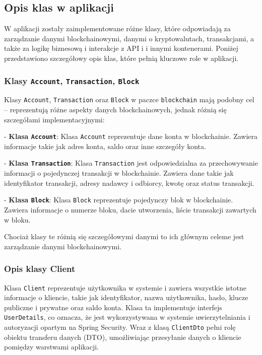 \subsection{Opis klas w aplikacji}

W aplikacji zostały zaimplementowane różne klasy, które odpowiadają za zarządzanie danymi blockchainowymi, danymi o kryptowalutach, transakcjami, a także za logikę biznesową i interakcje z API i i innymi kontenerami. Poniżej przedstawiono szczegółowy opis klas, które pełnią kluczowe role w aplikacji.

\subsubsection{Klasy \texttt{Account}, \texttt{Transaction}, \texttt{Block}}

Klasy \texttt{Account}, \texttt{Transaction} oraz \texttt{Block} w paczce \texttt{blockchain} mają podobny cel – reprezentują różne aspekty danych blockchainowych, jednak różnią się szczegółami implementacyjnymi:

- \textbf{Klasa \texttt{Account}}: 
  Klasa \texttt{Account} reprezentuje dane konta w blockchainie. Zawiera informacje takie jak adres konta, saldo oraz inne szczegóły konta. 

- \textbf{Klasa \texttt{Transaction}}: 
  Klasa \texttt{Transaction} jest odpowiedzialna za przechowywanie informacji o pojedynczej transakcji w blockchainie. Zawiera dane takie jak identyfikator transakcji, adresy nadawcy i odbiorcy, kwotę oraz status transakcji.
	
- \textbf{Klasa \texttt{Block}}: 
  Klasa \texttt{Block} reprezentuje pojedynczy blok w blockchainie. Zawiera informacje o numerze bloku, dacie utworzenia, liście transakcji zawartych w bloku. 

Chociaż klasy te różnią się szczegółowymi danymi to ich głównym celeme jest zarządzanie danymi blockchainowymi.

\subsubsection{Opis klasy Client}

Klasa \texttt{Client} reprezentuje użytkownika w systemie i zawiera wszystkie istotne informacje o kliencie, takie jak identyfikator, nazwa użytkownika, hasło, klucze publiczne i prywatne oraz saldo konta. Klasa ta implementuje interfejs \texttt{UserDetails}, co oznacza, że jest wykorzystywana w systemie uwierzytelniania i autoryzacji opartym na Spring Security. Wraz z klasą \texttt{ClientDto} pełni rolę obiektu transferu danych (DTO), umożliwiając przesyłanie danych o kliencie pomiędzy warstwami aplikacji.

